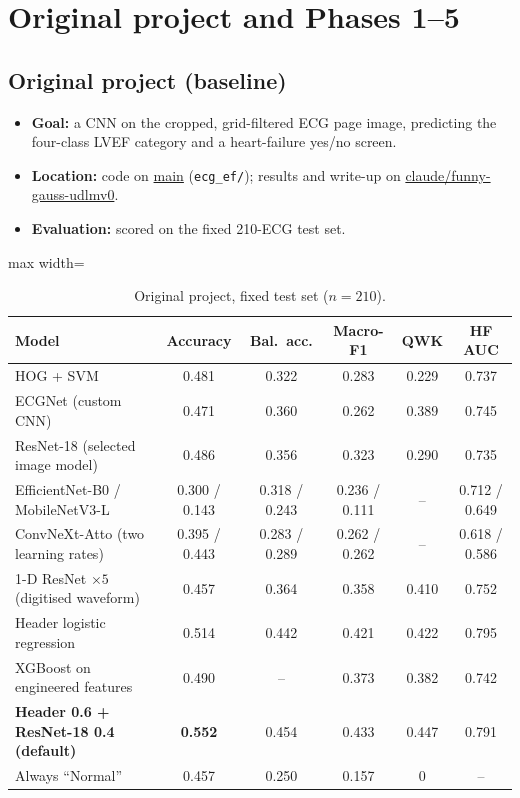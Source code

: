 \section{Original project and Phases 1--5}\label{sec:p15}

\subsection{Original project (baseline)}
\begin{itemize}
  \item \textbf{Goal:} a CNN on the cropped, grid-filtered ECG page image, predicting the four-class LVEF category
    and a heart-failure yes/no screen.
  \item \textbf{Location:} code on \url{main} (\texttt{ecg\_ef/}); results and write-up on
    \url{claude/funny-gauss-udlmv0}.
  \item \textbf{Evaluation:} scored on the fixed 210-ECG test set.
\end{itemize}
\begin{table}[H]\centering\small
\caption{Original project, fixed test set ($n=210$).}\label{tab:orig}
\begin{adjustbox}{max width=\linewidth}
\begin{tabular}{lccccc}\toprule
Model & Accuracy & Bal.\ acc. & Macro-F1 & QWK & HF AUC \\\midrule
HOG + SVM & 0.481 & 0.322 & 0.283 & 0.229 & 0.737 \\
ECGNet (custom CNN) & 0.471 & 0.360 & 0.262 & 0.389 & 0.745 \\
ResNet-18 (selected image model) & 0.486 & 0.356 & 0.323 & 0.290 & 0.735 \\
EfficientNet-B0 / MobileNetV3-L & 0.300 / 0.143 & 0.318 / 0.243 & 0.236 / 0.111 & -- & 0.712 / 0.649 \\
ConvNeXt-Atto (two learning rates) & 0.395 / 0.443 & 0.283 / 0.289 & 0.262 / 0.262 & -- & 0.618 / 0.586 \\
1-D ResNet $\times5$ (digitised waveform) & 0.457 & 0.364 & 0.358 & 0.410 & 0.752 \\
Header logistic regression & 0.514 & 0.442 & 0.421 & 0.422 & 0.795 \\
XGBoost on engineered features & 0.490 & -- & 0.373 & 0.382 & 0.742 \\
\textbf{Header 0.6 + ResNet-18 0.4 (default)} & \textbf{0.552} & 0.454 & 0.433 & 0.447 & 0.791 \\
Always ``Normal'' & 0.457 & 0.250 & 0.157 & 0 & -- \\\bottomrule
\end{tabular}
\end{adjustbox}
\end{table}

